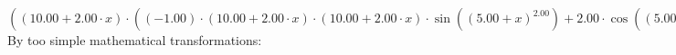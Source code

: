 \documentclass{article}
\begin{document}
$({\left({{10.00} + {{2.00} \cdot {x}}}\right) \cdot \left({{\left({-1.00}\right) \cdot {\left({{10.00} + {{2.00} \cdot {x}}}\right) \cdot {\left({{10.00} + {{2.00} \cdot {x}}}\right) \cdot  \sin {\left({\left({{5.00} + {x}}\right) ^ {2.00}}\right)} }}} + {{2.00} \cdot  \cos {\left({\left({{5.00} + {x}}\right) ^ {2.00}}\right)} }}\right)})'(x) = {{{\left({-2.00}\right) \cdot {\left({{10.00} + {{2.00} \cdot {x}}}\right) \cdot {\left({{10.00} + {{2.00} \cdot {x}}}\right) \cdot  \sin {\left({\left({{5.00} + {x}}\right) ^ {2.00}}\right)} }}} + {{4.00} \cdot  \cos {\left({\left({{5.00} + {x}}\right) ^ {2.00}}\right)} }} + {\left({{10.00} + {{2.00} \cdot {x}}}\right) \cdot \left({{{\left({-2.00}\right) \cdot {\left({{10.00} + {{2.00} \cdot {x}}}\right) \cdot  \sin {\left({\left({{5.00} + {x}}\right) ^ {2.00}}\right)} }} - {\left({{10.00} + {{2.00} \cdot {x}}}\right) \cdot \left({{{2.00} \cdot  \sin {\left({\left({{5.00} + {x}}\right) ^ {2.00}}\right)} } + {\left({{10.00} + {{2.00} \cdot {x}}}\right) \cdot { \cos {\left({\left({{5.00} + {x}}\right) ^ {2.00}}\right)}  \cdot \left({{10.00} + {{2.00} \cdot {x}}}\right)}}}\right)}} - {{2.00} \cdot {\left({{10.00} + {{2.00} \cdot {x}}}\right) \cdot  \sin {\left({\left({{5.00} + {x}}\right) ^ {2.00}}\right)} }}}\right)}}$\newline
\newline
By too simple mathematical transformations:
\end{document}
